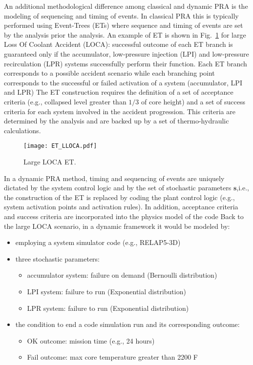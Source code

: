 An additional methodological difference among classical and dynamic PRA is the modeling of sequencing
and timing of events. In classical PRA this is typically performed using Event-Trees (ETs) where  
sequence and timing of events are set by the analysis prior the analysis.
An example of ET is shown in Fig.~\ref{fig:LLOCA_ET} for large Loss Of Coolant Accident (LOCA): successful 
outcome of each ET branch is guaranteed only if the accumulator, low-pressure injection (LPI) and low-pressure 
recirculation (LPR) systems successfully perform their function. 
Each ET branch corresponds to a possible accident scenario while each branching point corresponds to the 
successful or failed activation of a system (accumulator, LPI and LPR) 
The ET construction requires the definition of a set of acceptance criteria (e.g., collapsed level greater 
than $1/3$ of core height) and a set of success criteria for each system involved in the accident progression.
This criteria are determined by the analysis and are backed up by a set of thermo-hydraulic calculations.

\begin{figure}
    \centering
    \centerline{\texttt{[image: ET\_LLOCA.pdf]}} 
    \caption{Large LOCA ET.}
    \label{fig:LLOCA_ET}
\end{figure}

In a dynamic PRA method, timing and sequencing of events are uniquely dictated by the system control logic
and by the set of stochastic parameters $\boldsymbol s$,i.e., the construction of the ET is replaced by coding 
the plant control logic (e.g., system activation points and activation rules).
In addition, acceptance criteria and success criteria are incorporated into the physics model of the code
Back to the large LOCA scenario, in a dynamic framework it would be modeled by:
\begin{itemize}
  \item employing a system simulator code (e.g., RELAP5-3D) 
  \item three stochastic parameters: 
        \begin{itemize}
          \item accumulator system: failure on demand (Bernoulli distribution)
          \item LPI system: failure to run (Exponential distribution)
          \item LPR system: failure to run (Exponential distribution)
        \end{itemize}
   \item the condition to end a code simulation run and its corresponding outcome:
        \begin{itemize}
          \item OK outcome: mission time (e.g., 24 hours)
          \item Fail outcome: max core temperature greater than 2200 F 
        \end{itemize}       
\end{itemize}

